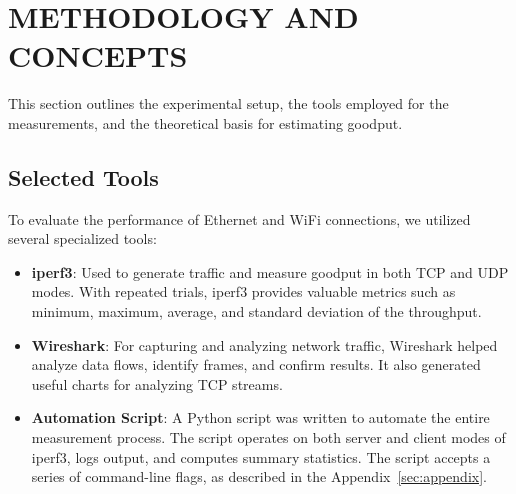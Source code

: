 
\section{METHODOLOGY AND CONCEPTS} \label{sec:methodology-and-concepts}


    This section outlines the experimental setup, the tools employed for the measurements, and the theoretical basis for estimating goodput.

    \subsection{Selected Tools} \label{subsec:selected-tools}

    To evaluate the performance of Ethernet and WiFi connections, we utilized several specialized tools:

        \begin{itemize}
            \item \textbf{iperf3}: Used to generate traffic and measure goodput in both TCP and UDP modes. With repeated trials, iperf3 provides valuable metrics such as minimum, maximum, average, and standard deviation of the throughput.
            \item \textbf{Wireshark}: For capturing and analyzing network traffic, Wireshark helped analyze data flows, identify frames, and confirm results. It also generated useful charts for analyzing TCP streams.
            \item \textbf{Automation Script}: A Python script was written to automate the entire measurement process. The script operates on both server and client modes of iperf3, logs output, and computes summary statistics. 
                The script accepts a series of command-line flags, as described in the Appendix~\ref{sec:appendix}.
        \end{itemize}

